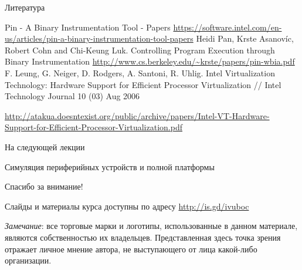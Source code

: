 \documentclass{beamer}
\begin{document}
\begin{frame}[allowframebreaks]{Литература}
\begin{thebibliography}{99}
     Pin - A Binary Instrumentation Tool - Papers \url{https://software.intel.com/en-us/articles/pin-a-binary-instrumentation-tool-papers}
     Heidi Pan, Krste Asanovíc, Robert Cohn and Chi-Keung Luk. Controlling Program Execution through Binary Instrumentation \url{http://www.cs.berkeley.edu/~krste/papers/pin-wbia.pdf}
     F. Leung, G. Neiger, D. Rodgers, A. Santoni, R. Uhlig. Intel Virtualization Technology: Hardware Support for Efficient Processor Virtualization // Intel Technology Journal 10 (03) Aug 2006

    {\scriptsize\url{http://atakua.doesntexist.org/public/archive/papers/Intel-VT-Hardware-Support-for-Efficient-Processor-Virtualization.pdf}}
\end{thebibliography}
\end{frame}


\begin{frame}{На следующей лекции}
\centering

Симуляция периферийных устройств и полной платформы

\end{frame}

\begin{frame}

{\huge{Спасибо за внимание!}\par}

\vfill

Слайды и материалы курса доступны по адресу \url{http://is.gd/ivuboc} %

\vfill

\tiny{\textit{Замечание}: все торговые марки и логотипы, использованные в данном материале, являются собственностью их владельцев. Представленная здесь точка зрения отражает личное мнение автора, не выступающего от лица какой-либо организации.}

\end{frame}
\end{document}
